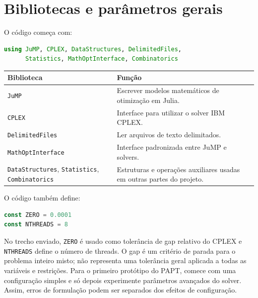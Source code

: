 \documentclass[11pt,a4paper]{article}
\begin{document}
\section{Bibliotecas e parâmetros gerais}
O código começa com:
\begin{lstlisting}[language=Julia]
using JuMP, CPLEX, DataStructures, DelimitedFiles,
      Statistics, MathOptInterface, Combinatorics
\end{lstlisting}
\begin{center}
\begin{tabular}{p{}p{}}
\toprule
\textbf{Biblioteca} & \textbf{Função}\\
\midrule
\texttt{JuMP} & Escrever modelos matemáticos de otimização em Julia.\\
\texttt{CPLEX} & Interface para utilizar o solver IBM CPLEX.\\
\texttt{DelimitedFiles} & Ler arquivos de texto delimitados.\\
\texttt{MathOptInterface} & Interface padronizada entre JuMP e solvers.\\
\texttt{DataStructures}, \texttt{Statistics}, \texttt{Combinatorics} & Estruturas e operações auxiliares usadas em outras partes do projeto.\\
\bottomrule
\end{tabular}
\end{center}
O código também define:
\begin{lstlisting}[language=Julia]
const ZERO = 0.0001
const NTHREADS = 8
\end{lstlisting}
No trecho enviado, \texttt{ZERO} é usado como tolerância de gap relativo do CPLEX e \texttt{NTHREADS} define o número de threads. O gap é um critério de parada para o problema inteiro misto; não representa uma tolerância geral aplicada a todas as variáveis e restrições.
Para o primeiro protótipo do PAPT, comece com uma configuração simples e só depois experimente parâmetros avançados do solver. Assim, erros de formulação podem ser separados dos efeitos de configuração.
\end{document}
